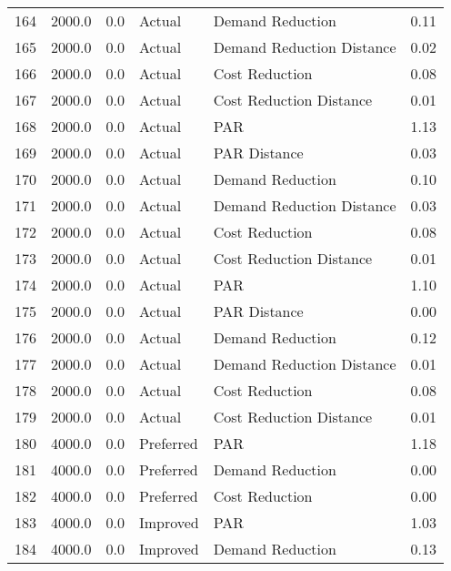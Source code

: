 \begin{longtable}{lrrllr}
164  &       2000.0 &     0.0 &         Actual &           Demand Reduction &   0.11 \\
165  &       2000.0 &     0.0 &         Actual &  Demand Reduction Distance &   0.02 \\
166  &       2000.0 &     0.0 &         Actual &             Cost Reduction &   0.08 \\
167  &       2000.0 &     0.0 &         Actual &    Cost Reduction Distance &   0.01 \\
168  &       2000.0 &     0.0 &         Actual &                        PAR &   1.13 \\
169  &       2000.0 &     0.0 &         Actual &               PAR Distance &   0.03 \\
170  &       2000.0 &     0.0 &         Actual &           Demand Reduction &   0.10 \\
171  &       2000.0 &     0.0 &         Actual &  Demand Reduction Distance &   0.03 \\
172  &       2000.0 &     0.0 &         Actual &             Cost Reduction &   0.08 \\
173  &       2000.0 &     0.0 &         Actual &    Cost Reduction Distance &   0.01 \\
174  &       2000.0 &     0.0 &         Actual &                        PAR &   1.10 \\
175  &       2000.0 &     0.0 &         Actual &               PAR Distance &   0.00 \\
176  &       2000.0 &     0.0 &         Actual &           Demand Reduction &   0.12 \\
177  &       2000.0 &     0.0 &         Actual &  Demand Reduction Distance &   0.01 \\
178  &       2000.0 &     0.0 &         Actual &             Cost Reduction &   0.08 \\
179  &       2000.0 &     0.0 &         Actual &    Cost Reduction Distance &   0.01 \\
180  &       4000.0 &     0.0 &      Preferred &                        PAR &   1.18 \\
181  &       4000.0 &     0.0 &      Preferred &           Demand Reduction &   0.00 \\
182  &       4000.0 &     0.0 &      Preferred &             Cost Reduction &   0.00 \\
183  &       4000.0 &     0.0 &       Improved &                        PAR &   1.03 \\
184  &       4000.0 &     0.0 &       Improved &           Demand Reduction &   0.13 \\

\end{longtable}
